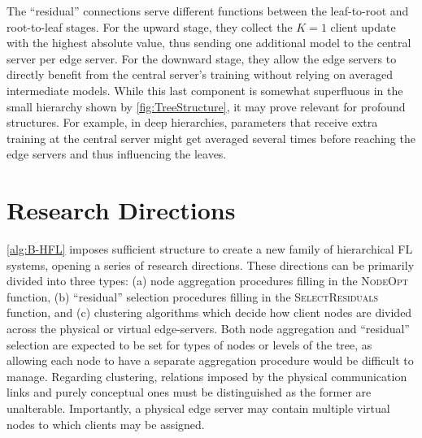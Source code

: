 The ``residual'' connections serve different functions between the leaf-to-root and root-to-leaf stages. For the upward stage, they collect the $K=1$ client update with the highest absolute value, thus sending one additional model to the central server per edge server. For the downward stage, they allow the edge servers to directly benefit from the central server's training without relying on averaged intermediate models. While this last component is somewhat superfluous in the small hierarchy shown by \cref{fig:TreeStructure}, it may prove relevant for profound structures. For example, in deep hierarchies, parameters that receive extra training at the central server might get averaged several times before reaching the edge servers and thus influencing the leaves.


\section{Research Directions}\label{sec:proposal:research_directions}
\cref{alg:B-HFL} imposes sufficient structure to create a new family of hierarchical FL systems, opening a series of research directions. These directions can be primarily divided into three types: (a) node aggregation procedures filling in the \textsc{NodeOpt} function, (b) ``residual'' selection procedures filling in the \textsc{SelectResiduals} function, and (c) clustering algorithms which decide how client nodes are divided across the physical or virtual edge-servers. Both node aggregation and ``residual'' selection are expected to be set for types of nodes or levels of the tree, as allowing each node to have a separate aggregation procedure would be difficult to manage. Regarding clustering, relations imposed by the physical communication links and purely conceptual ones must be distinguished as the former are unalterable. Importantly, a physical edge server may contain multiple virtual nodes to which clients may be assigned.

